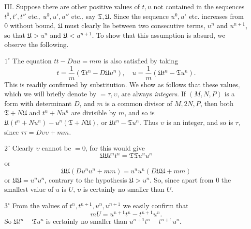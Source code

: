 III. Suppose there are other positive values of \(t,u\) not contained in the sequences \(t^0,t',t''\) etc., \(u^0,u',u''\) etc., say \(\mathfrak{T},\mathfrak{U}\). Since the sequence \(u^0,u'\) etc. increases from \(0\) without bound, \(\mathfrak{U}\) must clearly lie between two consecutive terms, \(u^n\) and \(u^{n+1}\), so that \(\mathfrak{U}>u^n\) and \(\mathfrak{U}<u^{n+1}\). To show that this assumption is absurd, we observe the following.

\(1^\circ\) The equation \(tt-Duu=mm\) is also satisfied by taking
\[
t=\frac1m(\mathfrak{T}t^n-D\mathfrak{U}u^n),\quad u=\frac1m(\mathfrak{U}t^n-\mathfrak{T}u^n).
\]
This is readily confirmed by substitution. We show as follows that these values, which we will briefly denote by \(=\tau,\upsilon\), are always \textit{integers}. If \((M,N,P)\) is a form with determinant \(D\), and \(m\) is a common divisor of \(M,2N,P\), then both \(\mathfrak{T}+N\mathfrak{U}\) and \(t^n+Nu^n\) are divisible by \(m\), and so is \(\mathfrak{U}(t^n+Nu^n)-u^n(\mathfrak{T}+N\mathfrak{U})\), or \(\mathfrak{U}t^n-\mathfrak{T}u^n\). Thus \(\upsilon\) is an integer, and so is \(\tau\), since \(\tau\tau=D\upsilon\upsilon+mm\).

\(2^\circ\) Clearly \(\upsilon\) cannot be \(=0\), for this would give
\[
\mathfrak{UU}t^n t^n=\mathfrak{TT}u^n u^n
\]
or
\[
\mathfrak{UU}(Du^n u^n+mm)=u^n u^n(D\mathfrak{UU}+mm)
\]
or \(\mathfrak{UU}=u^n u^n\), contrary to the hypothesis \(\mathfrak{U}>u^n\). So, since apart from \(0\) the smallest value of \(u\) is \(U\), \(\upsilon\) is certainly no smaller than \(U\).

\(3^\circ\) From the values of \(t^n,t^{n+1},u^n,u^{n+1}\) we easily confirm that
\[
mU=u^{n+1}t^n-t^{n+1}u^n.
\]
So \(\mathfrak{U}t^n-\mathfrak{T}u^n\) is certainly no smaller than \(u^{n+1}t^n-t^{n+1}u^n\).

